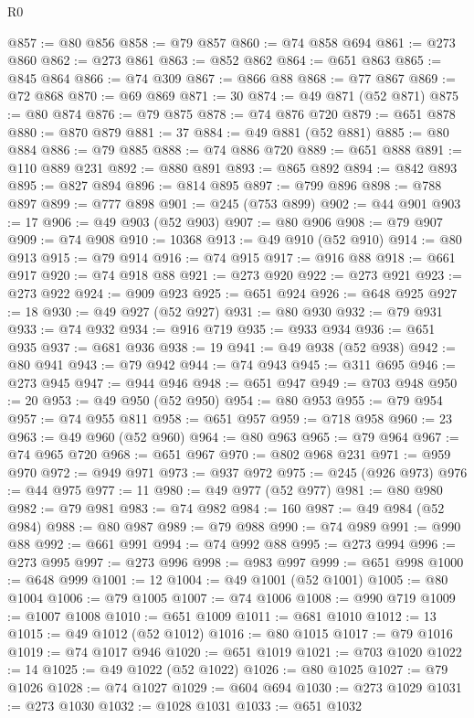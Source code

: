 \begin{lexlean}{R0}
\begin{coremodule}
@857 := @80 @856
@858 := @79 @857
@860 := @74 @858 @694
@861 := @273 @860
@862 := @273 @861
@863 := @852 @862
@864 := @651 @863
@865 := @845 @864
@866 := @74 @309
@867 := @866 @88
@868 := @77 @867
@869 := @72 @868
@870 := @69 @869
@871 := 30
@874 := @49 @871 (@52 @871)
@875 := @80 @874
@876 := @79 @875
@878 := @74 @876 @720
@879 := @651 @878
@880 := @870 @879
@881 := 37
@884 := @49 @881 (@52 @881)
@885 := @80 @884
@886 := @79 @885
@888 := @74 @886 @720
@889 := @651 @888
@891 := @110 @889 @231
@892 := @880 @891
@893 := @865 @892
@894 := @842 @893
@895 := @827 @894
@896 := @814 @895
@897 := @799 @896
@898 := @788 @897
@899 := @777 @898
@901 := @245 (@753 @899)
@902 := @44 @901
@903 := 17
@906 := @49 @903 (@52 @903)
@907 := @80 @906
@908 := @79 @907
@909 := @74 @908
@910 := 10368
@913 := @49 @910 (@52 @910)
@914 := @80 @913
@915 := @79 @914
@916 := @74 @915
@917 := @916 @88
@918 := @661 @917
@920 := @74 @918 @88
@921 := @273 @920
@922 := @273 @921
@923 := @273 @922
@924 := @909 @923
@925 := @651 @924
@926 := @648 @925
@927 := 18
@930 := @49 @927 (@52 @927)
@931 := @80 @930
@932 := @79 @931
@933 := @74 @932
@934 := @916 @719
@935 := @933 @934
@936 := @651 @935
@937 := @681 @936
@938 := 19
@941 := @49 @938 (@52 @938)
@942 := @80 @941
@943 := @79 @942
@944 := @74 @943
@945 := @311 @695
@946 := @273 @945
@947 := @944 @946
@948 := @651 @947
@949 := @703 @948
@950 := 20
@953 := @49 @950 (@52 @950)
@954 := @80 @953
@955 := @79 @954
@957 := @74 @955 @811
@958 := @651 @957
@959 := @718 @958
@960 := 23
@963 := @49 @960 (@52 @960)
@964 := @80 @963
@965 := @79 @964
@967 := @74 @965 @720
@968 := @651 @967
@970 := @802 @968 @231
@971 := @959 @970
@972 := @949 @971
@973 := @937 @972
@975 := @245 (@926 @973)
@976 := @44 @975
@977 := 11
@980 := @49 @977 (@52 @977)
@981 := @80 @980
@982 := @79 @981
@983 := @74 @982
@984 := 160
@987 := @49 @984 (@52 @984)
@988 := @80 @987
@989 := @79 @988
@990 := @74 @989
@991 := @990 @88
@992 := @661 @991
@994 := @74 @992 @88
@995 := @273 @994
@996 := @273 @995
@997 := @273 @996
@998 := @983 @997
@999 := @651 @998
@1000 := @648 @999
@1001 := 12
@1004 := @49 @1001 (@52 @1001)
@1005 := @80 @1004
@1006 := @79 @1005
@1007 := @74 @1006
@1008 := @990 @719
@1009 := @1007 @1008
@1010 := @651 @1009
@1011 := @681 @1010
@1012 := 13
@1015 := @49 @1012 (@52 @1012)
@1016 := @80 @1015
@1017 := @79 @1016
@1019 := @74 @1017 @946
@1020 := @651 @1019
@1021 := @703 @1020
@1022 := 14
@1025 := @49 @1022 (@52 @1022)
@1026 := @80 @1025
@1027 := @79 @1026
@1028 := @74 @1027
@1029 := @604 @694
@1030 := @273 @1029
@1031 := @273 @1030
@1032 := @1028 @1031
@1033 := @651 @1032

\end{coremodule}
\end{lexlean}
